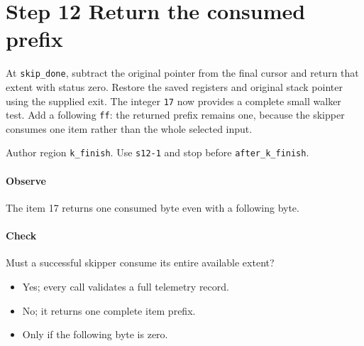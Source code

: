 \section{Step 12 Return the consumed prefix}\label{cbor-s12}
At \texttt{skip\_done}, subtract the original pointer from the final cursor and return that extent with status zero. Restore the saved registers and original stack pointer using the supplied exit. The integer \texttt{17} now provides a complete small walker test. Add a following \texttt{ff}: the returned prefix remains one, because the skipper consumes one item rather than the whole selected input.

Author region \texttt{k\_finish}. Use \texttt{s12-1} and stop before \texttt{after\_k\_finish}.

\paragraph{Observe} The item 17 returns one consumed byte even with a following byte.

\paragraph{Check} Must a successful skipper consume its entire available extent?
\begin{itemize}
  \item[A.] Yes; every call validates a full telemetry record.
  \item[B.] No; it returns one complete item prefix.
  \item[C.] Only if the following byte is zero.
\end{itemize}
